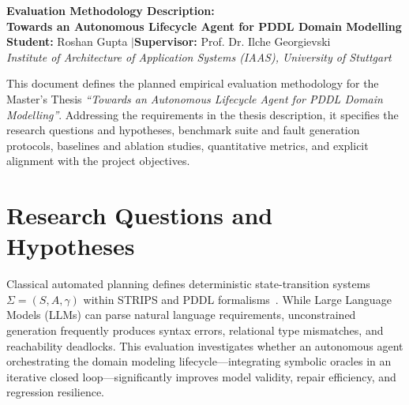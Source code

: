 \documentclass[10pt,a4paper]{article}
\begin{document}
\begin{center}
    {\large \textbf{Evaluation Methodology Description:}}\\[0.15em]
    {\normalsize \textbf{Towards an Autonomous Lifecycle Agent for PDDL Domain Modelling}}\\[0.25em]
    \textbf{Student:} Roshan Gupta \quad$\mid$\quad \textbf{Supervisor:} Prof. Dr. Ilche Georgievski\\[0.1em]
    \textit{Institute of Architecture of Application Systems (IAAS), University of Stuttgart}
\end{center}

\vspace{-0.5em}
\noindent
This document defines the planned empirical evaluation methodology for the Master's Thesis \textit{``Towards an Autonomous Lifecycle Agent for PDDL Domain Modelling''}. Addressing the requirements in the thesis description, it specifies the research questions and hypotheses, benchmark suite and fault generation protocols, baselines and ablation studies, quantitative metrics, and explicit alignment with the project objectives.

\section{Research Questions and Hypotheses}
Classical automated planning defines deterministic state-transition systems $\Sigma = (S, A, \gamma)$ within STRIPS and PDDL formalisms~\cite{ghallab2004automated,mcdermott1998pddl}. While Large Language Models (LLMs) can parse natural language requirements, unconstrained generation frequently produces syntax errors, relational type mismatches, and reachability deadlocks. This evaluation investigates whether an autonomous agent orchestrating the domain modeling lifecycle—integrating symbolic oracles in an iterative closed loop—significantly improves model validity, repair efficiency, and regression resilience.
\end{document}
